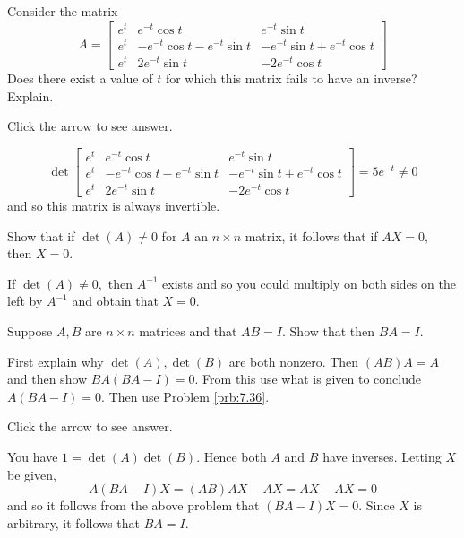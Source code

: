 \documentclass{ximera}
\begin{document}
\begin{problem}\label{prb:7.35} Consider the matrix
\begin{equation*}
A =
\left[
\begin{array}{ccc}
e^{t} & e^{-t}\cos t & e^{-t}\sin t \\
e^{t} & -e^{-t}\cos t-e^{-t}\sin t & -e^{-t}\sin t+e^{-t}\cos t \\
e^{t} & 2e^{-t}\sin t & -2e^{-t}\cos t
\end{array}
\right]
\end{equation*}
Does there exist a value of $t$ for which this matrix fails to have an
inverse? Explain.

Click the arrow to see answer.
\begin{expandable}
\[
\det \left[
\begin{array}{ccc}
e^{t} & e^{-t}\cos t & e^{-t}\sin t \\
e^{t} & -e^{-t}\cos t-e^{-t}\sin t & -e^{-t}\sin t+e^{-t}\cos t \\
e^{t} & 2e^{-t}\sin t & -2e^{-t}\cos t%
\end{array}
\right] = 5e^{-t} \neq 0
\]
and so this matrix is always invertible.
\end{expandable}
\end{problem}

\begin{problem}\label{prb:7.36} Show that if $\det \left( A\right) \neq 0$ for $A$
an $n\times n$ matrix, it follows that if $AX=0,$ then $X=0$.

\begin{hint}
If $\det \left( A\right) \neq 0,$ then $A^{-1}$ exists and so you could
multiply on both sides on the left by $A^{-1}$ and obtain that $X=0$.
\end{hint}
\end{problem}

\begin{problem}\label{prb:7.37} Suppose $A,B$ are $n\times n$ matrices and that $AB=I.$ Show that then
$BA=I.$ 
\begin{hint}
First explain why
$\det \left( A\right) ,\det \left( B\right) $ are both nonzero. Then $\left(
AB\right) A=A$ and then show $BA\left( BA-I\right) =0.$ From this use what
is given to conclude $A\left( BA-I\right) =0.$ Then use Problem
\ref{prb:7.36}.
\end{hint}

Click the arrow to see answer.
\begin{expandable}
You have $1=\det \left( A\right) \det \left( B\right) $.
Hence both $A$ and $B$ have inverses. Letting $X$ be given,
\[
A\left( BA-I\right) X=\left( AB\right) AX-AX=AX-AX = 0
\]
and so it follows from the above problem that $\left( BA-I\right)X=0.$ Since $X$ is arbitrary, it follows that $BA=I.$
\end{expandable}
\end{problem}
\end{document}
